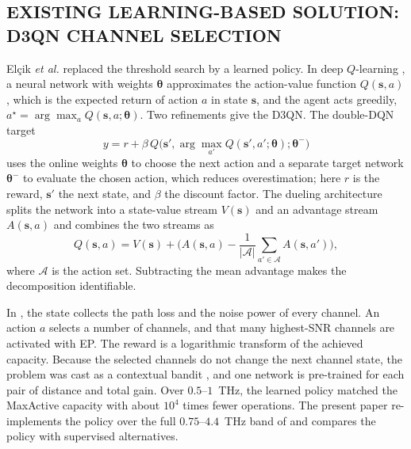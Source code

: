 \documentclass{ieee-ojvt}
\begin{document}
\subsection{EXISTING LEARNING-BASED SOLUTION: D3QN CHANNEL SELECTION}
\label{sec:prior-d3qn}
Elçik \emph{et al.} \cite{elcik2025d3qn} replaced the threshold search by a learned
policy. In deep $Q$-learning \cite{mnih2015dqn}, a neural network with weights
$\boldsymbol{\theta}$ approximates the action-value function $Q(\mathbf{s},a)$, which is
the expected return of action $a$ in state $\mathbf{s}$, and the agent acts greedily,
$a^\star=\arg\max_a Q(\mathbf{s},a;\boldsymbol{\theta})$. Two refinements give the D3QN.
The double-DQN target \cite{vanhasselt2016double}
\begin{equation}
y=r+\beta\,Q\!\big(\mathbf{s}',\arg\max_{a'}Q(\mathbf{s}',a';\boldsymbol{\theta});
\boldsymbol{\theta}^-\big)
\label{eq:double}
\end{equation}
uses the online weights $\boldsymbol{\theta}$ to choose the next action and a separate
target network $\boldsymbol{\theta}^-$ to evaluate the chosen action, which reduces
overestimation; here $r$ is the reward, $\mathbf{s}'$ the next state, and $\beta$ the
discount factor. The dueling architecture \cite{wang2016dueling} splits the network into
a state-value stream $V(\mathbf{s})$ and an advantage stream $A(\mathbf{s},a)$ and
combines the two streams as
\begin{equation}
Q(\mathbf{s},a)=V(\mathbf{s})+\Big(A(\mathbf{s},a)-\frac{1}{|\mathcal{A}|}
\sum_{a'\in\mathcal{A}}A(\mathbf{s},a')\Big),
\label{eq:dueling}
\end{equation}
where $\mathcal{A}$ is the action set. Subtracting the mean advantage makes the
decomposition identifiable.

In \cite{elcik2025d3qn}, the state collects the path loss and the noise power of every
channel. An action $a$ selects a number of channels, and that many highest-SNR channels
are activated with EP. The reward is a logarithmic transform of the achieved capacity.
Because the selected channels do not change the next channel state, the problem was cast
as a contextual bandit \cite{langford2007epoch}, and one network is pre-trained for each
pair of distance and total gain. Over $0.5$--$1$~THz, the learned policy matched the
MaxActive capacity with about $10^4$ times fewer operations. The present paper
re-implements the policy over the full $0.75$--$4.4$~THz band of
\cite{10399804} and compares the policy with supervised alternatives.
\end{document}
